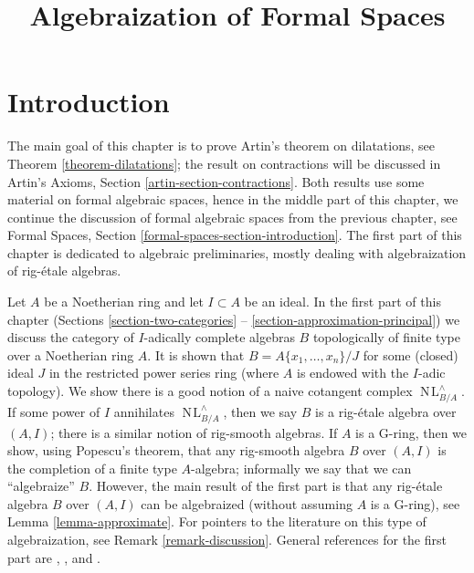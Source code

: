 \documentclass{stacks-project}
\theoremstyle{plain}
\theoremstyle{definition}
\theoremstyle{remark}
\numberwithin{equation}{subsection}
\def\NL{\mathop{N\!L}\nolimits}
\begin{document}
\title{Algebraization of Formal Spaces}


\maketitle

\label{section-phantom}

\tableofcontents

\section{Introduction}
\label{section-introduction}

\noindent
The main goal of this chapter is to prove Artin's theorem on dilatations,
see Theorem \ref{theorem-dilatations}; the result on contractions will be
discussed in Artin's Axioms, Section \ref{artin-section-contractions}.
Both results use some material on formal algebraic spaces, hence
in the middle part of this chapter, we
continue the discussion of formal algebraic spaces from the previous
chapter, see Formal Spaces, Section \ref{formal-spaces-section-introduction}.
The first part of this chapter is dedicated to algebraic preliminaries,
mostly dealing with algebraization of rig-\'etale algebras.

\medskip\noindent
Let $A$ be a Noetherian ring and let $I \subset A$ be an ideal. In the
first part of this chapter (Sections \ref{section-two-categories}
-- \ref{section-approximation-principal})
we discuss the category of $I$-adically complete algebras $B$
topologically of finite type over a Noetherian ring $A$.
It is shown that $B = A\{x_1, \ldots, x_n\}/J$ for some
(closed) ideal $J$ in the restricted power series ring
(where $A$ is endowed with the $I$-adic topology).
We show there is a good notion of a naive cotangent complex
$\NL_{B/A}^\wedge$. If some power of $I$ annihilates
$\NL_{B/A}^\wedge$, then we say $B$ is a rig-\'etale algebra
over $(A, I)$; there is a similar notion of rig-smooth algebras.
If $A$ is a G-ring, then we show, using Popescu's theorem,
that any rig-smooth algebra $B$ over $(A, I)$ is the completion
of a finite type $A$-algebra; informally we say that we can ``algebraize'' $B$.
However, the main result of the first part is that any rig-\'etale
algebra $B$ over $(A, I)$ can be algebraized (without assuming $A$ is
a G-ring), see Lemma \ref{lemma-approximate}. For pointers to the literature
on this type of algebraization, see Remark \ref{remark-discussion}.
General references for the first part are
\cite{EGA}, \cite{Abbes}, and \cite{Fujiwara-Kato}.
\end{document}
